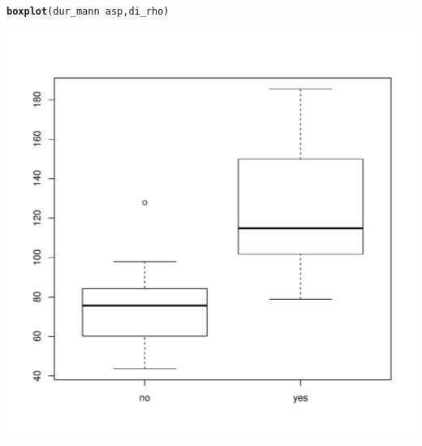 \documentclass[a4paper,11pt]{article}\usepackage[]{graphicx}\usepackage[]{color}
\makeatletter
\def\maxwidth{ %
  \ifdim\Gin@nat@width>\linewidth
    \linewidth
  \else
    \Gin@nat@width
  \fi
}
\newcommand{\hlopt}[1]{\textcolor[rgb]{0,0,0}{#1}}%
\newcommand{\hlstd}[1]{\textcolor[rgb]{0.345,0.345,0.345}{#1}}%
\newcommand{\hlkwd}[1]{\textcolor[rgb]{0.737,0.353,0.396}{\textbf{#1}}}%
\newenvironment{kframe}{%
 \def\at@end@of@kframe{}%
 \ifinner\ifhmode%
  \def\at@end@of@kframe{\end{minipage}}%
  \begin{minipage}{\columnwidth}%
 \fi\fi%
 \def\FrameCommand##1{\hskip\@totalleftmargin \hskip-\fboxsep
 \colorbox{shadecolor}{##1}\hskip-\fboxsep
     \hskip-\linewidth \hskip-\@totalleftmargin \hskip\columnwidth}%
 \MakeFramed {\advance\hsize-\width
   \@totalleftmargin\z@ \linewidth\hsize
   \@setminipage}}%
 {\par\unskip\endMakeFramed%
 \at@end@of@kframe}
\newenvironment{knitrout}{}{} %
\makeatother
\begin{document}
\begin{knitrout}
\begin{kframe}\begin{alltt}
\hlkwd{boxplot}\hlstd{(dur_mann} \hlopt{~} \hlstd{asp, di_rho)}
\end{alltt}
\end{kframe}
\includegraphics[width=\maxwidth]{img/unnamed-chunk-24-5} 

\end{knitrout}
\end{document}
